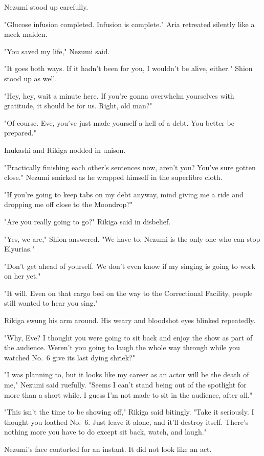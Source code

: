 Nezumi stood up carefully.

{\sffamily "Glucose infusion completed. Infusion is complete."} Aria retreated
silently like a meek maiden.

"You saved my life," Nezumi said.

"It goes both ways. If it hadn't been for you, I wouldn't be alive,
either." Shion stood up as well.

"Hey, hey, wait a minute here. If you're gonna overwhelm yourselves with
gratitude, it should be for us. Right, old man?"

"Of course. Eve, you've just made yourself a hell of a debt. You better
be prepared."

Inukashi and Rikiga nodded in unison.

"Practically finishing each other's sentences now, aren't you? You've
sure gotten close." Nezumi smirked as he wrapped himself in the
superfibre cloth.

"If you're going to keep tabs on my debt anyway, mind giving me a ride
and dropping me off close to the Moondrop?"

"Are you really going to go?" Rikiga said in disbelief.

"Yes, we are," Shion answered. "We have to. Nezumi is the only one who
can stop Elyurias."

"Don't get ahead of yourself. We don't even know if my singing is going
to work on her yet."

"It will. Even on that cargo bed on the way to the Correctional
Facility, people still wanted to hear you sing."

Rikiga swung his arm around. His weary and bloodshot eyes blinked
repeatedly.

"Why, Eve? I thought you were going to sit back and enjoy the show as
part of the audience. Weren't you going to laugh the whole way through
while you watched No.~6 give its last dying shriek?"

"I was planning to, but it looks like my career as an actor will be the
death of me," Nezumi said ruefully. "Seems I can't stand being out of
the spotlight for more than a short while. I guess I'm not made to sit
in the audience, after all."

"This isn't the time to be showing off," Rikiga said bitingly. "Take it
seriously. I thought you loathed No.~6. Just leave it alone, and it'll
destroy itself. There's nothing more you have to do except sit back,
watch, and laugh."

Nezumi's face contorted for an instant. It did not look like an act.

